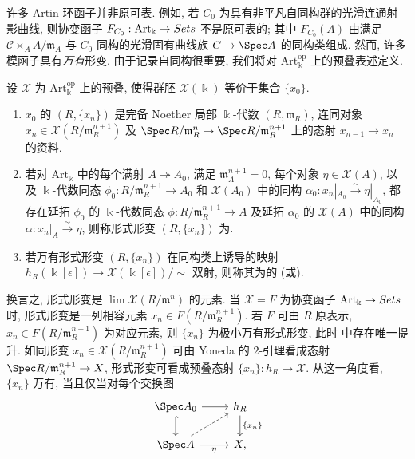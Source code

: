许多 Artin 环函子并非原可表. 例如, 若 $C_0$ 为具有非平凡自同构群的光滑连通射影曲线, 则协变函子 $F_{C_0}:\mathrm{Art}_{\Bbbk}\to Sets$ 不是原可表的; 其中 $F_{C_0}(A)$ 由满足 $\mathcal C\times_AA/\mathfrak m_A$ 与 $C_0$ 同构的光滑固有曲线族 $\mathcal C\to\Spec A$ 的同构类组成. 然而, 许多模函子具有\textit{万有}形变. 由于记录自同构很重要, 我们将对 $\mathrm{Art}_{\Bbbk}^{\mathrm{op}}$ 上的预叠表述定义.
\begin{definition}[万有性]\label{src:C.4.2}
设 $\mathcal X$ 为 $\mathrm{Art}_{\Bbbk}^{\mathrm{op}}$ 上的预叠, 使得群胚 $\mathcal X(\Bbbk)$ 等价于集合 $\{x_0\}$.
\begin{enumerate}[(1)]
\item $x_0$ 的 $(R,\{x_n\})$ 是完备 Noether 局部 $\Bbbk$-代数 $(R,\mathfrak m_R)$, 连同对象 $x_n\in\mathcal X(R/\mathfrak m_R^{n+1})$ 及 $\Spec R/\mathfrak m_R^n\to\Spec R/\mathfrak m_R^{n+1}$ 上的态射 $x_{n-1}\to x_n$ 的资料.
\item 若对 $\mathrm{Art}_{\Bbbk}$ 中的每个满射 $A\twoheadrightarrow A_0$, 满足 $\mathfrak m_A^{n+1}=0$, 每个对象 $\eta\in\mathcal X(A)$, 以及 $\Bbbk$-代数同态 $\phi_0:R/\mathfrak m_R^{n+1}\to A_0$ 和 $\mathcal X(A_0)$ 中的同构 $\alpha_0:x_n|_{A_0}\xrightarrow{\sim}\eta|_{A_0}$, 都存在延拓 $\phi_0$ 的 $\Bbbk$-代数同态 $\phi:R/\mathfrak m_R^{n+1}\to A$ 及延拓 $\alpha_0$ 的 $\mathcal X(A)$ 中的同构 $\alpha:x_n|_A\xrightarrow{\sim}\eta$, 则称形式形变 $(R,\{x_n\})$ 为.
\item 若万有形式形变 $(R,\{x_n\})$ 在同构类上诱导的映射 $h_R(\Bbbk[\epsilon])\to\mathcal X(\Bbbk[\epsilon])/{\sim}$ 双射, 则称其为的 (或).
\end{enumerate}
\end{definition}
换言之, 形式形变是 $\lim\mathcal X(R/\mathfrak m^n)$ 的元素. 当 $\mathcal X=F$ 为协变函子 $\mathrm{Art}_{\Bbbk}\to Sets$ 时, 形式形变是一列相容元素 $x_n\in F(R/\mathfrak m_R^{n+1})$. 若 $F$ 可由 $R$ 原表示, $x_n\in F(R/\mathfrak m_R^{n+1})$ 为对应元素, 则 $\{x_n\}$ 为极小万有形式形变, 此时  中存在唯一提升. 如同形变 $x_n\in\mathcal X(R/\mathfrak m_R^{n+1})$ 可由 Yoneda 的 $2$-引理看成态射 $\Spec R/\mathfrak m_R^{n+1}\to\mathcal X$, 形式形变可看成预叠态射 $\{x_n\}:h_R\to\mathcal X$. 从这一角度看, $\{x_n\}$ 万有, 当且仅当对每个交换图
\begin{equation}\label{src:C.4.3}
\begin{tikzcd}
\Spec A_0\arrow[r]\arrow[d,hook]&h_R\arrow[d,"{\{x_n\}}"]\\
\Spec A\arrow[r,"\eta"']\arrow[ur,dashed]&\mathcal X,
\end{tikzcd}
\end{equation}
